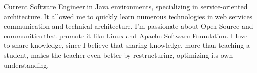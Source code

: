 

\begin{cvparagraph}

Current Software Engineer in Java environments, specializing in service-oriented architecture. It allowed me to quickly learn numerous technologies in web services communication and technical architecture.  I'm passionate about Open Source and communities that promote it like Linux and Apache Software Foundation. I love to share knowledge, since I believe that sharing knowledge, more than teaching a student, makes the teacher even better by restructuring, optimizing its own understanding.

\end{cvparagraph}
